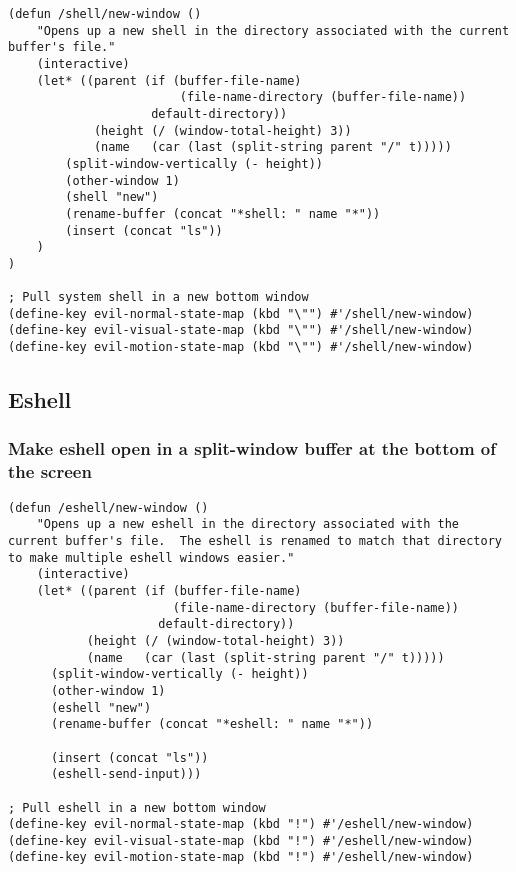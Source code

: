 \documentclass[11pt]{article}
\begin{document}
\begin{verbatim}
(defun /shell/new-window ()
    "Opens up a new shell in the directory associated with the current buffer's file."
    (interactive)
    (let* ((parent (if (buffer-file-name)
                        (file-name-directory (buffer-file-name))
                    default-directory))
            (height (/ (window-total-height) 3))
            (name   (car (last (split-string parent "/" t)))))
        (split-window-vertically (- height))
        (other-window 1)
        (shell "new")
        (rename-buffer (concat "*shell: " name "*"))
        (insert (concat "ls"))
    )
)

; Pull system shell in a new bottom window
(define-key evil-normal-state-map (kbd "\"") #'/shell/new-window)
(define-key evil-visual-state-map (kbd "\"") #'/shell/new-window)
(define-key evil-motion-state-map (kbd "\"") #'/shell/new-window)
\end{verbatim}


\subsection*{Eshell}
\label{sec:org1d7b6d3}

\subsubsection*{Make eshell open in a split-window buffer at the bottom of the screen}
\label{sec:orgf63ad59}

\begin{verbatim}
(defun /eshell/new-window ()
    "Opens up a new eshell in the directory associated with the current buffer's file.  The eshell is renamed to match that directory to make multiple eshell windows easier."
    (interactive)
    (let* ((parent (if (buffer-file-name)
                       (file-name-directory (buffer-file-name))
                     default-directory))
           (height (/ (window-total-height) 3))
           (name   (car (last (split-string parent "/" t)))))
      (split-window-vertically (- height))
      (other-window 1)
      (eshell "new")
      (rename-buffer (concat "*eshell: " name "*"))

      (insert (concat "ls"))
      (eshell-send-input)))

; Pull eshell in a new bottom window
(define-key evil-normal-state-map (kbd "!") #'/eshell/new-window)
(define-key evil-visual-state-map (kbd "!") #'/eshell/new-window)
(define-key evil-motion-state-map (kbd "!") #'/eshell/new-window)
\end{verbatim}
\end{document}
